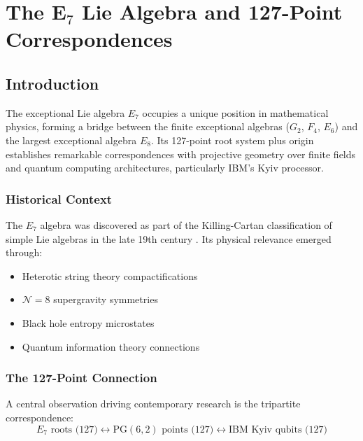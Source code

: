 
\chapter{The E$_7$ Lie Algebra and 127-Point Correspondences}
\label{ch:e7_lie_algebra}

\section{Introduction}

The exceptional Lie algebra $E_7$ occupies a unique position in mathematical physics, forming a bridge between the finite exceptional algebras ($G_2$, $F_4$, $E_6$) and the largest exceptional algebra $E_8$. Its 127-point root system plus origin establishes remarkable correspondences with projective geometry over finite fields and quantum computing architectures, particularly IBM's Kyiv processor.

\subsection{Historical Context}

The $E_7$ algebra was discovered as part of the Killing-Cartan classification of simple Lie algebras in the late 19th century \cite{killing1888, cartan1894}. Its physical relevance emerged through:
\begin{itemize}
    \item Heterotic string theory compactifications \cite{green2012superstring}
    \item $\mathcal{N}=8$ supergravity symmetries \cite{cremmer1978}
    \item Black hole entropy microstates \cite{ferrara1997}
    \item Quantum information theory connections \cite{duff2007}
\end{itemize}

\subsection{The 127-Point Connection}

A central observation driving contemporary research is the tripartite correspondence:
\begin{equation}
\label{eq:127_correspondence}
\boxed{E_7 \text{ roots (127)} \longleftrightarrow \text{PG}(6,2) \text{ points (127)} \longleftrightarrow \text{IBM Kyiv qubits (127)}}
\end{equation}

